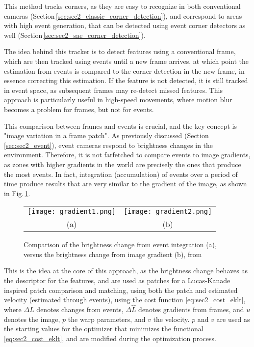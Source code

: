 This method tracks corners, as they are easy to recognize in both conventional cameras (Section\,\ref{sec:sec2_classic_corner_detection}), and correspond to areas with high event generation, that can be detected using event corner detectors as well (Section\,\ref{sec:sec2_sae_corner_detection}).

The idea behind this tracker is to detect features using a conventional frame, which are then tracked using events until a new frame arrives, at which point the estimation from events is compared to the corner detection in the new frame, in essence correcting this estimation. If the feature is not detected, it is still tracked in event space, as subsequent frames may re-detect missed features. This approach is particularly useful in high-speed movements, where motion blur becomes a problem for frames, but not for events.

This comparison between frames and events is crucial, and the key concept is "image variation in a frame patch". As previously discussed (Section\,\ref{sec:sec2_event}), event cameras respond to brightness changes in the environment. Therefore, it is not farfetched to compare events to image gradients, as zones with higher gradients in the world are precisely the ones that produce the most events. In fact, integration (accumulation) of events over a period of time produce results that are very similar to the gradient of the image, as shown in Fig.\,\ref{fig:sec2_gradient_comparison}.

\begin{figure}[ht]
	\centering
		\begin{tabular}{cc}
		   \texttt{[image: gradient1.png]} &
		   \hspace{1cm} \texttt{[image: gradient2.png]} \\
		   (a) & (b)  \\
		\end{tabular}
	\caption[Comparison of the brightness change from event integration with the brightness change from image gradient]{Comparison of the brightness change from event integration (a), versus the brightness change from image gradient (b), from \cite{gehrig2020eklt}}
	\label{fig:sec2_gradient_comparison}
\end{figure}

This is the idea at the core of this approach, as the brightness change behaves as the descriptor for the features, and are used as patches for a Lucas-Kanade inspired patch comparison and matching, using both the patch and estimated velocity (estimated through events), using the cost function \eqref{eq:sec2_cost_eklt}, where $\Delta L$ denotes changes from events, $\Delta \hat{L}$ denotes gradients from frames, and $u$ denotes the image, $p$ the warp parameters, and $v$ the velocity. $p$ and $v$ are used as the starting values for the optimizer that minimizes the functional \eqref{eq:sec2_cost_eklt}, and are modified during the optimization process.

